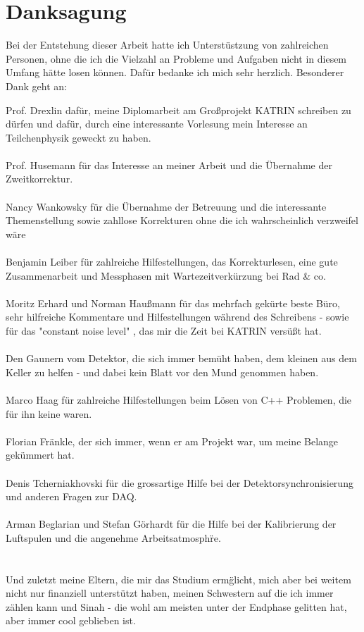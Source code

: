 \chapter*{Danksagung}
Bei der Entstehung dieser Arbeit hatte ich Unterst\"ustzung von zahlreichen Personen, ohne die ich die Vielzahl an Probleme und Aufgaben nicht in diesem Umfang h\"atte l\:osen k\"onnen. Daf\"ur bedanke ich mich sehr herzlich. Besonderer Dank geht an:

Prof. Drexlin daf\"ur, meine Diplomarbeit am Gro\ss projekt KATRIN schreiben zu d\"urfen und daf\"ur, durch eine interessante Vorlesung mein Interesse an Teilchenphysik geweckt zu haben.\\\\
Prof. Husemann f\"ur das Interesse an meiner Arbeit und die \"Ubernahme der Zweitkorrektur.\\\\
Nancy Wankowsky f\"ur die \"Ubernahme der Betreuung und die interessante Themenstellung sowie zahllose Korrekturen ohne die ich wahrscheinlich verzweifel w\"are \\\\
Benjamin Leiber f\"ur zahlreiche Hilfestellungen, das Korrekturlesen, eine gute Zusammenarbeit und Messphasen mit Wartezeitverk\"urzung bei Rad \& co.\\\\
Moritz Erhard und Norman Hau\ss mann f\"ur das mehrfach gek\"urte beste B\"uro, sehr hilfreiche Kommentare und Hilfestellungen w\"ahrend des Schreibens - sowie  f\"ur das "constant noise level" \cite{transformer}, das mir die Zeit bei KATRIN vers\"u\ss t hat.\\\\
Den Gaunern vom Detektor, die sich immer bem\"uht haben, dem kleinen aus dem Keller zu helfen - und dabei kein Blatt vor den Mund genommen haben.\\\\
Marco Haag f\"ur zahlreiche Hilfestellungen beim L\"osen von C++ Problemen, die f\"ur ihn keine waren.\\\\
Florian Fr\"ankle, der sich immer, wenn er am Projekt war, um meine Belange gek\"ummert hat.\\\\
Denis Tcherniakhovski f\"ur die grossartige Hilfe bei der Detektorsynchronisierung und anderen Fragen zur DAQ.\\\\
Arman Beglarian und Stefan G\"orhardt f\"ur die Hilfe bei der Kalibrierung der Luftspulen und die angenehme Arbeitsatmosph\"re.\\\\
\\
Und zuletzt meine Eltern, die mir das Studium erm\"glicht, mich aber bei weitem nicht nur finanziell unterst\"utzt haben, meinen Schwestern auf die ich immer z\"ahlen kann und Sinah - die wohl am meisten unter der Endphase gelitten hat, aber immer cool geblieben ist.


